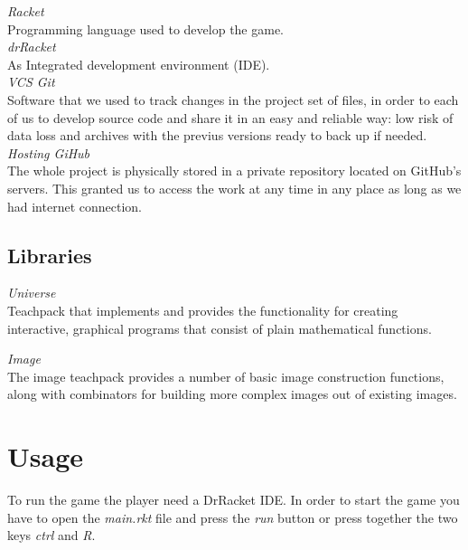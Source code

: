 \documentclass{article}
\begin{document}
 \hspace{0.5cm}\textit{Racket}\\
 Programming language used to develop the game.\\
 

 \textit{drRacket}\\
 As Integrated development environment (IDE).\\
 
 \textit{VCS Git}\\
Software that we used to track changes in the project set of files, in order to each of us to develop source code and share it in an easy and reliable way: low risk of data loss and archives with the previus versions ready to back up if needed.\\

 \textit{Hosting GiHub}\\
The whole project is physically stored in a private repository located on GitHub's servers. This granted us to access the work at any time in any place as long as we had internet connection.

\subsection{Libraries}
 \hspace{0.5cm}\textit{Universe}\\
 Teachpack that implements and provides the functionality for creating interactive, graphical programs that consist of plain mathematical functions.
 
 \textit{Image}\\
The image teachpack provides a number of basic image construction functions, along with combinators for building more complex images out of existing images.

 \section{Usage}
To run the game the player need a DrRacket IDE. In order to start the game you have to open the \textit{main.rkt} file and press the \textit{run} button or press together the two keys \textit{ctrl} and \textit{R}.

\end{document}
